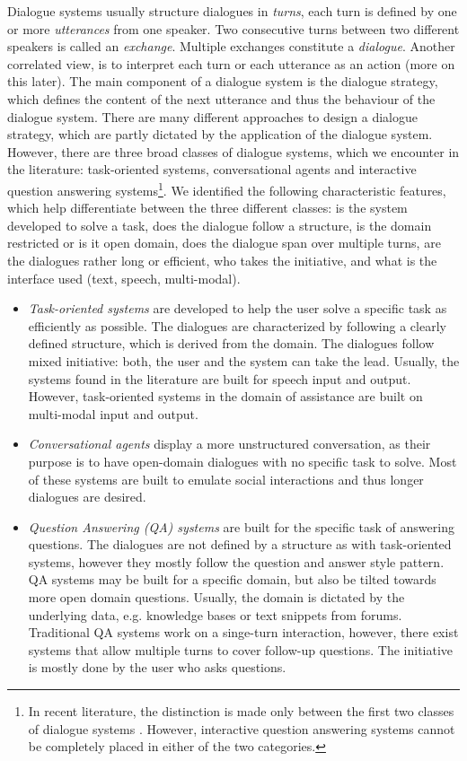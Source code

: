 \documentclass{lihlith}
\theoremstyle{definition}
\theoremstyle{remark}
\begin{document}
Dialogue systems usually structure dialogues in \emph{turns}, each turn is defined by one or more \emph{utterances} from one speaker. Two consecutive turns between two different speakers is called an \emph{exchange}. Multiple exchanges constitute a \emph{dialogue}. Another correlated view, is to interpret each turn or each utterance as an action (more on this later). The main component of a dialogue system is the dialogue strategy, which defines the content of the next utterance and thus the behaviour of the dialogue system. There are many different approaches to design a dialogue strategy, which are partly dictated by the application of the dialogue system. However, there are three broad classes of dialogue systems, which we encounter in the literature: task-oriented systems, conversational agents and interactive question answering systems\footnote{In recent literature, the distinction is made only between the first two classes of dialogue systems \cite{serban2015survey,Chen:2017:SDS:3166054.3166058,jura2017speech_dial}. However, interactive question answering systems cannot be completely placed in either of the two categories. }. We identified the following characteristic features, which help differentiate between the three different classes: is the system developed to solve a task, does the dialogue follow a structure, is the domain restricted or is it open domain, does the dialogue span over multiple turns, are the dialogues rather long or efficient, who takes the initiative, and what is the interface used (text, speech, multi-modal).
\begin{itemize}
\item \emph{Task-oriented systems} are developed to help the user solve a specific task as efficiently as possible. The dialogues are characterized by following a clearly defined structure, which is derived from the domain. The dialogues follow mixed initiative: both, the user and the system can take the lead. Usually, the systems found in the literature are built for speech input and output. However, task-oriented systems in the domain of assistance are built on multi-modal input and output. 
\item \emph{Conversational agents} display a more unstructured conversation, as their purpose is to have open-domain dialogues with no specific task to solve. Most of these systems are built to emulate social interactions and thus longer dialogues are desired.
\item \emph{Question Answering (QA) systems} are built for the specific task of answering questions. The dialogues are not defined by a structure as with task-oriented systems, however they mostly follow the question and answer style pattern. QA systems may be built for a specific domain, but also be tilted towards more open domain questions. Usually, the domain is dictated by the underlying data, e.g. knowledge bases or text snippets from forums. Traditional QA systems work on a singe-turn interaction, however, there exist systems that allow multiple turns to cover follow-up questions. The initiative is mostly done by the user who asks questions. 
\end{itemize}
\end{document}
